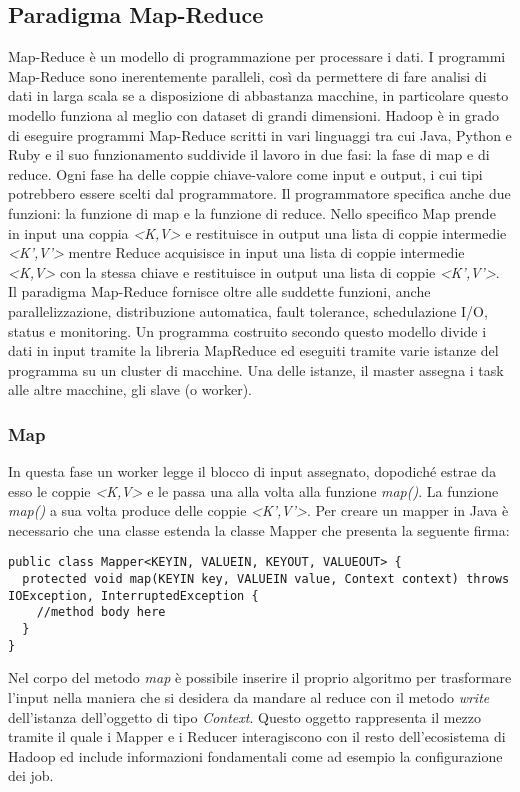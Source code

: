 \subsection{Paradigma Map-Reduce}
Map-Reduce è un modello di programmazione per processare i dati. I programmi Map-Reduce sono inerentemente paralleli, così da permettere di fare analisi di dati in larga scala se a disposizione di abbastanza macchine, in particolare questo modello funziona al meglio con dataset di grandi dimensioni. Hadoop è in grado di eseguire programmi Map-Reduce scritti in vari linguaggi tra cui Java, Python e Ruby e il suo funzionamento suddivide il lavoro in due fasi: la fase di map e di reduce. Ogni fase ha delle coppie chiave-valore come input e output, i cui tipi potrebbero essere scelti dal programmatore. Il programmatore specifica anche due funzioni: la funzione di map e la funzione di reduce. Nello specifico Map prende in input una coppia \textit{<K,V>} e restituisce in output una lista di coppie intermedie \textit{<K',V'>} mentre Reduce acquisisce in input una lista di coppie intermedie \textit{<K,V> } con la stessa chiave e restituisce in output una lista di coppie \textit{<K',V'>}. Il paradigma Map-Reduce fornisce oltre alle suddette funzioni, anche parallelizzazione, distribuzione automatica, fault tolerance, schedulazione I/O, status e monitoring. Un programma costruito secondo questo modello divide i dati in input tramite la libreria MapReduce ed eseguiti tramite varie istanze del programma su un cluster di macchine. Una delle istanze, il master assegna i task alle altre macchine, gli slave (o worker).
\subsubsection{Map}
In questa fase un worker legge il blocco di input assegnato, dopodiché estrae da esso le coppie \textit{<K,V>} e le passa una alla volta alla funzione \textit{map()}. La funzione \textit{map()} a sua volta produce delle coppie \textit{<K',V'>}. Per creare un mapper in Java è necessario che una classe estenda la classe Mapper che presenta la seguente firma:
\begin{lstlisting}
public class Mapper<KEYIN, VALUEIN, KEYOUT, VALUEOUT> {
  protected void map(KEYIN key, VALUEIN value, Context context) throws IOException, InterruptedException {
    //method body here
  }
}
\end{lstlisting}
Nel corpo del metodo \textit{map} è possibile inserire il proprio algoritmo per trasformare l'input nella maniera che si desidera da mandare al reduce con il metodo \textit{write} dell'istanza dell'oggetto di tipo \textit{Context}. Questo oggetto rappresenta il mezzo tramite il quale i Mapper e i Reducer interagiscono con il resto dell'ecosistema di Hadoop ed include informazioni fondamentali come ad esempio la configurazione dei job.
